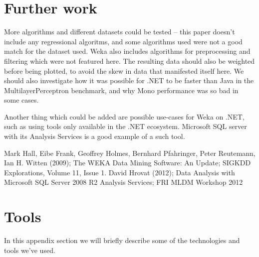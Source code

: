 \documentclass[journal]{IEEEtran/IEEEtran}
\begin{document}
\section{Further work}
More algorithms and different datasets could be tested -- this paper doesn't include any regressional algoritms, and some algorithms used were not a good match for the dataset used. Weka also includes algorithms for preprocessing and filtering which were not featured here. The resulting data should also be weighted before being plotted, to avoid the skew in data that manifested itself here. We should also investigate how it was possible for .NET to be faster than Java in the MultilayerPerceptron benchmark, and why Mono performance was so bad in some cases.

Another thing which could be added are possible use-cases for Weka on .NET, such as using tools only available in the .NET ecosystem. Microsoft SQL server with its Analysis Services is a good example of a such tool\cite{sqlas:2012}.
\begin{thebibliography}{1}

Mark Hall, Eibe Frank, Geoffrey Holmes, Bernhard Pfahringer, Peter Reutemann, Ian H. Witten (2009); The WEKA Data Mining Software: An Update; SIGKDD Explorations, Volume 11, Issue 1.
David Hrovat (2012); Data Analysis with Microsoft SQL Server 2008 R2 Analysis Services; FRI MLDM Workshop 2012

\end{thebibliography}

\newpage

\appendices
\section{Tools}\label{Tools}
In this appendix section we will briefly describe some of the technologies and tools we've used.
\end{document}
